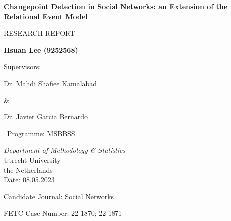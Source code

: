 \documentclass[]{interact}
\theoremstyle{plain}%
\theoremstyle{definition}
\theoremstyle{remark}
\begin{document}
	
    \begin{titlepage}
		\begin{center}
			\vspace*{1.1cm}
			
			\Huge
			\textbf{Changepoint Detection in Social Networks: an Extension of the Relational Event Model}
			
			\vspace{1.8cm}
			\LARGE
			RESEARCH REPORT
			
			\vspace{1.8cm}
			
			\textbf{Hsuan Lee (9252568)}
			
			\vspace{1cm}
			Supervisors: 
			
			\vspace{0.5cm}
			
			Dr. Mahdi Shafiee Kamalabad 
			
			\& 
			
			Dr. Javier Garcia Bernardo
			
			\vspace{2cm}
			\Large
			
			\ Programme: MSBBSS
			
			\vspace{0.3cm}
			
			\emph{Department of Methodology \& Statistics}\\
			
			\vspace{0.3cm}
			Utrecht University\\
			the Netherlands\\
			
			\vspace{1.5cm}    
			\Large
			Date: 08.05.2023
			
			Candidate Journal: Social Networks
			
			FETC Case Number: 22-1870; 22-1871
		
		\end{center}
	\end{titlepage}



	
	
	
	
\end{document}
